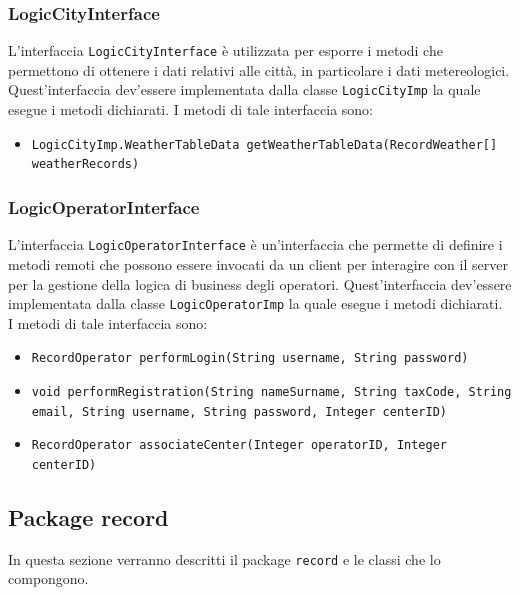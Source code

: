 \subsubsection{LogicCityInterface}
L'interfaccia \texttt{LogicCityInterface} è utilizzata per esporre i metodi che permettono di ottenere i dati relativi alle città, in particolare i dati metereologici.
Quest'interfaccia dev'essere implementata dalla classe \texttt{LogicCityImp} la quale esegue i metodi dichiarati.
I metodi di tale interfaccia sono:
\begin{itemize}
    \item \texttt{LogicCityImp.WeatherTableData getWeatherTableData(RecordWeather[] weatherRecords)}
\end{itemize}

\subsubsection{LogicOperatorInterface}
L'interfaccia \texttt{LogicOperatorInterface} è un'interfaccia che permette di definire i metodi remoti che possono essere invocati da un client per interagire con il server per la gestione della logica di business degli operatori.
Quest'interfaccia dev'essere implementata dalla classe \texttt{LogicOperatorImp} la quale esegue i metodi dichiarati.
I metodi di tale interfaccia sono:
\begin{itemize}
    \item \texttt{RecordOperator performLogin(String username, String password)}
    \item \texttt{void performRegistration(String nameSurname, String taxCode, String email, String username, String password, Integer centerID)}
    \item \texttt{RecordOperator associateCenter(Integer operatorID, Integer centerID)}
\end{itemize}

\subsection{Package record}
In questa sezione verranno descritti il package \texttt{record} e le classi che lo compongono.\\

